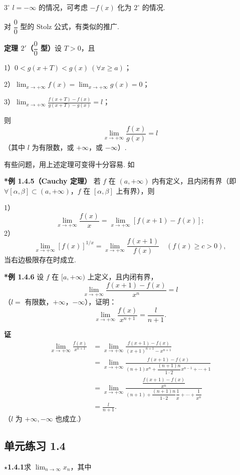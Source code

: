 \documentclass[UTF8,12pt,a4paper,fontset=fandol]{ctexart}
\begin{document}
$3^\circ$ $l=-\infty$ 的情况，可考虑 $-f(x)$ 化为 $2^\circ$ 的情况.

对 $\dfrac00$ 型的 Stolz 公式，有类似的推广.

\noindent\textbf{定理 $2'$（$\dfrac00$ 型）}\quad 设 $T>0$，且

1）$0<g(x+T)<g(x)\ (\forall x\ge a)$；

2）$\displaystyle\lim_{x\to+\infty}f(x)=\lim_{x\to+\infty}g(x)=0$；

3）$\displaystyle\lim_{x\to+\infty}\frac{f(x+T)-f(x)}{g(x+T)-g(x)}=l$；

则
\[
  \lim_{x\to+\infty}\frac{f(x)}{g(x)}=l
\]
（其中 $l$ 为有限数，或 $+\infty$，或 $-\infty$）.

有些问题，用上述定理可变得十分容易. 如

\noindent\textbf{*例 1.4.5（Cauchy 定理）}\quad
若 $f$ 在 $(a,+\infty)$ 内有定义，且内闭有界（即 $\forall[\alpha,\beta]\subset(a,+\infty)$，$f$ 在 $[\alpha,\beta]$ 上有界），则

1）
\[
  \lim_{x\to+\infty}\frac{f(x)}x
  =\lim_{x\to+\infty}[f(x+1)-f(x)];
\]
2）
\[
  \lim_{x\to+\infty}[f(x)]^{1/x}
  =\lim_{x\to+\infty}\frac{f(x+1)}{f(x)}
  \quad(f(x)\ge c>0),
\]
当右边极限存在时成立.

\noindent\textbf{*例 1.4.6}\quad
设 $f$ 在 $[a,+\infty)$ 上定义，且内闭有界，
\[
  \lim_{x\to+\infty}\frac{f(x+1)-f(x)}{x^n}=l
\]
（$l=$ 有限数，$+\infty$，$-\infty$），证明：
\[
  \lim_{x\to+\infty}\frac{f(x)}{x^{n+1}}=\frac{l}{n+1}.
\]

\noindent\textbf{证}\quad
\[
\begin{aligned}
  \lim_{x\to+\infty}\frac{f(x)}{x^{n+1}}
  &=\lim_{x\to+\infty}
  \frac{f(x+1)-f(x)}{(x+1)^{n+1}-x^{n+1}}\\
  &=\lim_{x\to+\infty}
  \frac{f(x+1)-f(x)}
  {(n+1)x^n+\dfrac{(n+1)n}{1\cdot2}x^{n-1}+\cdots+1}\\
  &=\lim_{x\to+\infty}
  \frac{\dfrac{f(x+1)-f(x)}{x^n}}
  {(n+1)+\dfrac{(n+1)n}{1\cdot2}\dfrac1x+\cdots+\dfrac1{x^n}}\\
  &=\frac{l}{n+1}.
\end{aligned}
\]
（$l$ 为 $+\infty,-\infty$ 也成立.）

\subsection*{单元练习 1.4}

\noindent\textbf{$\star$1.4.1}\quad 求 $\displaystyle\lim_{n\to\infty}x_n$，其中
\end{document}
